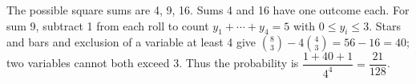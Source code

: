 The possible square sums are 4, 9, 16. Sums 4 and 16 have one outcome each. For sum 9, subtract 1 from each roll to count $y_1+\cdots+y_4=5$ with $0\le y_i\le3$. Stars and bars and exclusion of a variable at least 4 give $\binom83-4\binom43=56-16=40$; two variables cannot both exceed 3. Thus the probability is $\dfrac{1+40+1}{4^4}=\boxed{\dfrac{21}{128}}$.
